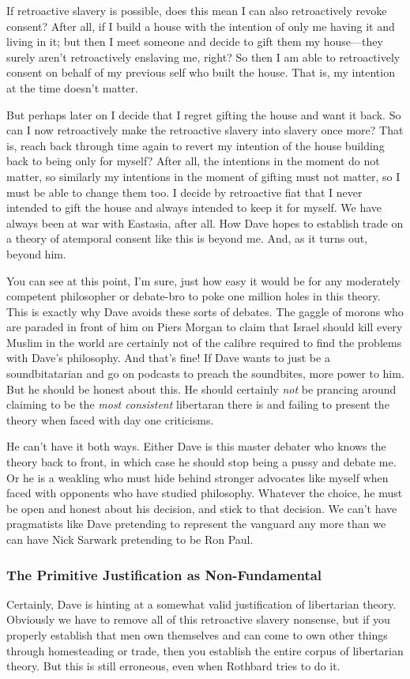 \documentclass[11pt]{article}
\begin{document}
If retroactive slavery is possible, does this mean I can also retroactively revoke consent? After all, if I build a house with the intention of only me having it and living in it; but then I meet someone and decide to gift them my house---they surely aren't retroactively enslaving me, right? So then I am able to retroactively consent on behalf of my previous self who built the house. That is, my intention at the time doesn't matter.

But perhaps later on I decide that I regret gifting the house and want it back. So can I now retroactively make the retroactive slavery into slavery once more? That is, reach back through time again to revert my intention of the house building back to being only for myself? After all, the intentions in the moment do not matter, so similarly my intentions in the moment of gifting must not matter, so I must be able to change them too. I decide by retroactive fiat that I never intended to gift the house and always intended to keep it for myself. We have always been at war with Eastasia, after all. How Dave hopes to establish trade on a theory of atemporal consent like this is beyond me. And, as it turns out, beyond him.

You can see at this point, I'm sure, just how easy it would be for any moderately competent philosopher or debate-bro to poke one million holes in this theory. This is exactly why Dave avoids these sorts of debates. The gaggle of morons who are paraded in front of him on Piers Morgan to claim that Israel should kill every Muslim in the world are certainly not of the calibre required to find the problems with Dave's philosophy. And that's fine! If Dave wants to just be a soundbitatarian and go on podcasts to preach the soundbites, more power to him. But he should be honest about this. He should certainly \emph{not} be prancing around claiming to be the \emph{most consistent} libertaran there is and failing to present the theory when faced with day one criticisms.

He can't have it both ways. Either Dave is this master debater who knows the theory back to front, in which case he should stop being a pussy and debate me. Or he is a weakling who must hide behind stronger advocates like myself when faced with opponents who have studied philosophy. Whatever the choice, he must be open and honest about his decision, and stick to that decision. We can't have pragmatists like Dave pretending to represent the vanguard any more than we can have Nick Sarwark pretending to be Ron Paul.
\subsubsection{The Primitive Justification as Non-Fundamental}
\label{sec:org9e9fd6f}
Certainly, Dave is hinting at a somewhat valid justification of libertarian theory. Obviously we have to remove all of this retroactive slavery nonsense, but if you properly establish that men own themselves and can come to own other things through homesteading or trade, then you establish the entire corpus of libertarian theory. But this is still erroneous, even when Rothbard tries to do it.
\end{document}
